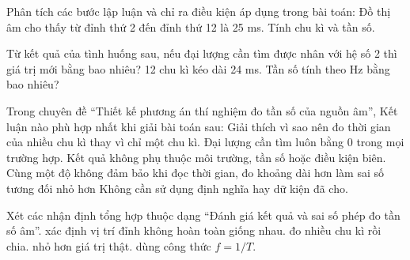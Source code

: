 \begin{ex}
Phân tích các bước lập luận và chỉ ra điều kiện áp dụng trong bài toán: Đồ thị âm cho thấy từ đỉnh thứ 2 đến đỉnh thứ 12 là 25 ms. Tính chu kì và tần số.
\choiceTF

\end{ex}

\begin{ex}
Từ kết quả của tình huống sau, nếu đại lượng cần tìm được nhân với hệ số 2 thì giá trị mới bằng bao nhiêu? 12 chu kì kéo dài 24 ms. Tần số tính theo Hz bằng bao nhiêu?
\end{ex}

\begin{ex}
Trong chuyên đề “Thiết kế phương án thí nghiệm đo tần số của nguồn âm”, Kết luận nào phù hợp nhất khi giải bài toán sau: Giải thích vì sao nên đo thời gian của nhiều chu kì thay vì chỉ một chu kì.
\choice
{Đại lượng cần tìm luôn bằng 0 trong mọi trường hợp.}
{Kết quả không phụ thuộc môi trường, tần số hoặc điều kiện biên.}
{\True Cùng một độ không đảm bảo khi đọc thời gian, đo khoảng dài hơn làm sai số tương đối nhỏ hơn}
{Không cần sử dụng định nghĩa hay dữ kiện đã cho.}
\end{ex}

\begin{ex}
Xét các nhận định tổng hợp thuộc dạng “Đánh giá kết quả và sai số phép đo tần số âm”.
\choiceTF
{\True xác định vị trí đỉnh không hoàn toàn giống nhau.}
{\True đo nhiều chu kì rồi chia.}
{\True nhỏ hơn giá trị thật.}
{dùng công thức $f=1/T$.}
\end{ex}

